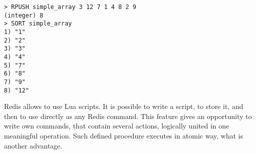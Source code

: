 \begin{lstlisting}[float=h, caption=Usage of SORT command., label=listing:RedisSort]
> RPUSH simple_array 3 12 7 1 4 8 2 9
(integer) 8
> SORT simple_array
1) "1"
2) "2"
3) "3"
4) "4"
5) "7"
6) "8"
7) "9"
8) "12"
\end{lstlisting}

Redis allows to use Lua scripts.
It is possible to write a script, to store it, and then to use directly as any Redis command.
This feature gives an opportunity to write own commands, that contain several actions, logically united in one meaningful operation.
Such defined procedure executes in atomic way, what is another advantage.